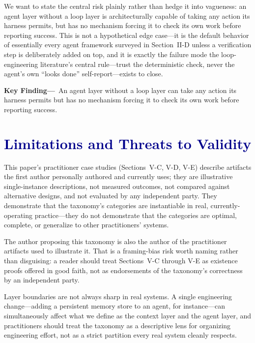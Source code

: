 \documentclass[journal]{IEEEtran}
\begin{document}
We want to state the central risk plainly rather than hedge it into vagueness: an agent layer without a loop layer is architecturally capable of taking any action its harness permits, but has no mechanism forcing it to check its own work before reporting success. This is not a hypothetical edge case---it is the default behavior of essentially every agent framework surveyed in Section~II-D unless a verification step is deliberately added on top, and it is exactly the failure mode the loop-engineering literature's central rule---trust the deterministic check, never the agent's own ``looks done'' self-report---exists to close.

\begin{mdframed}[linecolor=ambercolor, linewidth=1.2pt, backgroundcolor=ambercolor!6,
  innerleftmargin=8pt, innerrightmargin=8pt, innertopmargin=6pt, innerbottommargin=6pt,
  roundcorner=4pt]
\noindent\textbf{\textcolor{ambercolor}{Key Finding---}}~An agent layer without a loop layer can take any action its harness permits but has no mechanism forcing it to check its own work before reporting success.
\end{mdframed}

\section{\textcolor{darkblue}{Limitations and Threats to Validity}}

This paper's practitioner case studies (Sections~V-C, V-D, V-E) describe artifacts the first author personally authored and currently uses; they are illustrative single-instance descriptions, not measured outcomes, not compared against alternative designs, and not evaluated by any independent party. They demonstrate that the taxonomy's categories are instantiable in real, currently-operating practice---they do not demonstrate that the categories are optimal, complete, or generalize to other practitioners' systems.

The author proposing this taxonomy is also the author of the practitioner artifacts used to illustrate it. That is a framing-bias risk worth naming rather than disguising: a reader should treat Sections~V-C through V-E as existence proofs offered in good faith, not as endorsements of the taxonomy's correctness by an independent party.

Layer boundaries are not always sharp in real systems. A single engineering change---adding a persistent memory store to an agent, for instance---can simultaneously affect what we define as the context layer and the agent layer, and practitioners should treat the taxonomy as a descriptive lens for organizing engineering effort, not as a strict partition every real system cleanly respects.
\end{document}
